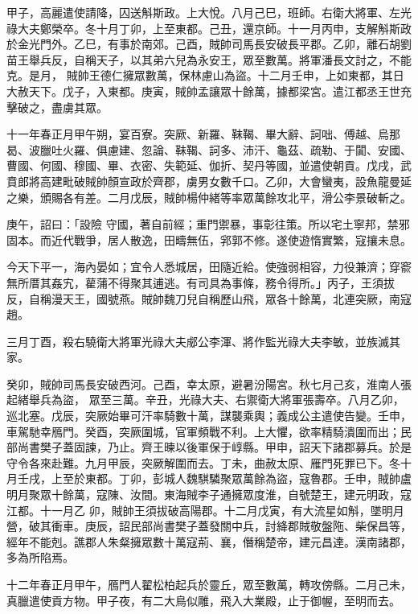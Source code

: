 \begin{pinyinscope}
 甲子，高麗遣使請降，囚送斛斯政。上大悅。八月己巳，班師。右衛大將軍、左光祿大夫鄭榮卒。冬十月丁卯，上至東都。己丑，還京師。十一月丙申，支解斛斯政於金光門外。乙巳，有事於南郊。己酉，賊帥司馬長安破長平郡。乙卯，離石胡劉苗王舉兵反，自稱天子，以其弟六兒為永安王，眾至數萬。將軍潘長文討之，不能克。是月，
 賊帥王德仁擁眾數萬，保林慮山為盜。十二月壬申，上如東都，其日大赦天下。戊子，入東都。庚寅，賊帥孟讓眾十餘萬，據都梁宮。遣江都丞王世充擊破之，盡虜其眾。



 十一年春正月甲午朔，宴百寮。突厥、新羅、靺鞨、畢大辭、訶咄、傅越、烏那曷、波臘吐火羅、俱慮建、忽論、靺鞨、訶多、沛汗、龜茲、疏勒、于闐、安國、曹國、何國、穆國、畢、衣密、失範延、伽折、契丹等國，並遣使朝貢。戊戌，武賁郎將高建毗破賊帥顏宣政於齊郡，虜男女數千口。乙卯，大會蠻夷，設魚龍曼延之樂，頒賜各有差。二月戊辰，賊帥楊仲緒等率眾萬餘攻北平，滑公李景破斬之。



 庚午，詔曰：「設險
 守國，著自前經；重門禦暴，事彰往策。所以宅土寧邦，禁邪固本。而近代戰爭，居人散逸，田疇無伍，郛郭不修。遂使遊惰實繁，寇攘未息。



 今天下平一，海內晏如；宜令人悉城居，田隨近給。使強弱相容，力役兼濟；穿窬無所厝其姦宄，雚蒲不得聚其逋逃。有司具為事條，務令得所。」丙子，王須拔反，自稱漫天王，國號燕。賊帥魏刀兒自稱歷山飛，眾各十餘萬，北連突厥，南寇趙。



 三月丁酉，殺右驍衛大將軍光祿大夫郕公李渾、將作監光祿大夫李敏，並族滅其家。



 癸卯，賊帥司馬長安破西河。己酉，幸太原，避暑汾陽宮。秋七月己亥，淮南人張起緒舉兵為盜，
 眾至三萬。辛丑，光祿大夫、右禦衛大將軍張壽卒。八月乙卯，巡北塞。戊辰，突厥始畢可汗率騎數十萬，謀襲乘輿；義成公主遣使告變。壬申，車駕馳幸鴈門。癸酉，突厥圍城，官軍頻戰不利。上大懼，欲率精騎潰圍而出；民部尚書樊子蓋固諫，乃止。齊王暕以後軍保于崞縣。甲申，詔天下諸郡募兵。於是守令各來赴難。九月甲辰，突厥解圍而去。丁未，曲赦太原、雁門死罪已下。冬十月壬戌，上至於東都。丁卯，彭城人魏騏驎聚眾萬餘為盜，寇魯郡。壬申，賊帥盧明月聚眾十餘萬，寇陳、汝間。東海賊李子通擁眾度淮，自號楚王，建元明政，寇江都。十一月乙
 卯，賊帥王須拔破高陽郡。十二月戊寅，有大流星如斛，墜明月營，破其衝車。庚辰，詔民部尚書樊子蓋發關中兵，討絳郡賊敬盤陁、柴保昌等，經年不能剋。譙郡人朱粲擁眾數十萬寇荊、襄，僭稱楚帝，建元昌達。漢南諸郡，多為所陷焉。



 十二年春正月甲午，鴈門人翟松柏起兵於靈丘，眾至數萬，轉攻傍縣。二月己未，真臘遣使貢方物。甲子夜，有二大鳥似雕，飛入大業殿，止于御幄，至明而去。




\end{pinyinscope}
